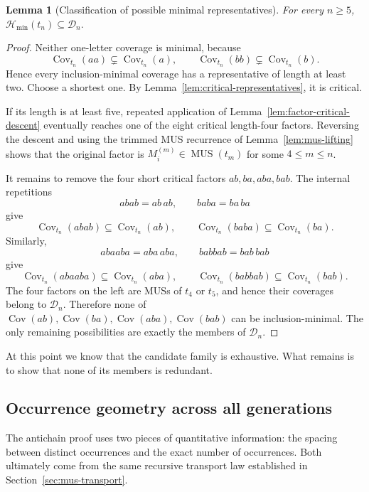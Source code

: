 \documentclass[11pt,a4paper]{article}
\newtheorem{lemma}[theorem]{Lemma}
\theoremstyle{definition}\newtheorem{definition}[theorem]{Definition}
\theoremstyle{remark}\newtheorem{remark}[theorem]{Remark}
\newcommand{\Cov}{\operatorname{Cov}}
\newcommand{\MUS}{\operatorname{MUS}}
\newcommand{\Hmin}{\mathcal{H}_{\min}}
\begin{document}
\begin{lemma}[Classification of possible minimal representatives]
\label{lem:possible-minimal-representatives}
For every $n\ge5$,
$
 \Hmin(t_n)\subseteq\mathcal D_n.
$
\end{lemma}

\begin{proof}
Neither one-letter coverage is minimal, because
\[
 \Cov_{t_n}(aa)\subsetneq\Cov_{t_n}(a),
 \qquad
 \Cov_{t_n}(bb)\subsetneq\Cov_{t_n}(b).
\]
Hence every inclusion-minimal coverage has a representative of length at least two.  Choose a shortest one.  By Lemma~\ref{lem:critical-representatives}, it is critical.

If its length is at least five, repeated application of Lemma~\ref{lem:factor-critical-descent} eventually reaches one of the eight critical length-four factors.  Reversing the descent and using the trimmed MUS recurrence of Lemma~\ref{lem:mus-lifting} shows that the original factor is $M_i^{(m)}\in\MUS(t_m)$ for some $4\le m\le n$.

It remains to remove the four short critical factors $ab,ba,aba,bab$.  The internal repetitions
\[
 abab=ab\,ab,
 \qquad
 baba=ba\,ba
\]
give
\[
 \Cov_{t_n}(abab)\subseteq\Cov_{t_n}(ab),
 \qquad
 \Cov_{t_n}(baba)\subseteq\Cov_{t_n}(ba).
\]
Similarly,
\[
 abaaba=aba\,aba,
 \qquad
 babbab=bab\,bab
\]
give
\[
 \Cov_{t_n}(abaaba)\subseteq\Cov_{t_n}(aba),
 \qquad
 \Cov_{t_n}(babbab)\subseteq\Cov_{t_n}(bab).
\]
The four factors on the left are MUSs of $t_4$ or $t_5$, and hence their coverages belong to $\mathcal D_n$.  Therefore none of $\Cov(ab),\Cov(ba),\Cov(aba),\Cov(bab)$ can be inclusion-minimal.  The only remaining possibilities are exactly the members of $\mathcal D_n$.
\end{proof}

At this point we know that the candidate family is exhaustive.  What remains is to show that none of its members is redundant.

\subsection{Occurrence geometry across all generations}
\label{subsec:all-generation-geometry}

The antichain proof uses two pieces of quantitative information: the spacing between distinct occurrences and the exact number of occurrences.  Both ultimately come from the same recursive transport law established in Section~\ref{sec:mus-transport}.
\end{document}
